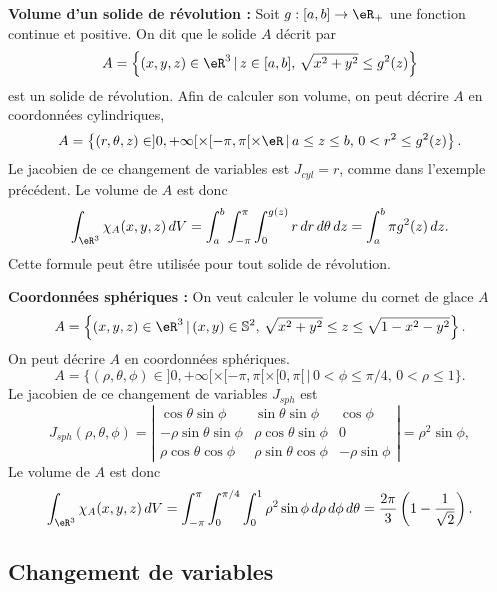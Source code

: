 \begin{example}
\textbf{Volume d'un solide de révolution : }Soit $g:[a,b]\to\eR_+$ une fonction continue et positive. On dit que le solide $A$ décrit par
\[
A=\left\{(x,y,z)\in\eR^3\, \vert \, z\in[a,b], \,\sqrt{x^2+y^2}\leq g^2(z) \right\}
\]
est un solide de révolution. Afin de calculer son volume, on peut décrire $A$ en coordonnées cylindriques, 
\[
A=\left\{(r,\theta,z) \in ]0, +\infty[\times [-\pi,\pi[\times \eR\,\vert\, a\leq z\leq b, \, 0<r^2\leq g^2(z) \right\}.
\]
Le jacobien de ce changement de variables est  $J_{cyl}=r$, comme dans l'exemple précédent. Le volume de $A$ est donc
\[
\int_{\eR^3}\chi_{A}(x,y,z)\, dV=\int_a^{b}\int_{-\pi}^{\pi}\int_{0}^{g(z)} r  \,dr\,d\theta\, dz=\int_a^{b} \pi g^2(z) \, dz.
\] 
Cette formule peut être utilisée pour tout solide de révolution. 
\end{example}

\begin{example}
\textbf{Coordonnées sphériques : }On veut calculer le volume du cornet de glace  $A$ 
\[
A=\left\{(x,y,z)\in\eR^3\, \vert \, (x,y)\in \mathbb{S}^2, \,\sqrt{x^2+y^2}\leq z\leq \sqrt{1-x^2-y^2} \right\}. 
\]
On peut décrire $A$ en coordonnées sphériques. 
\[
A=\{(\rho,\theta,\phi) \in ]0, +\infty[\times [-\pi,\pi[\times [0,\pi[\,\vert\, 0<\phi\leq\pi/4, \, 0<\rho\leq 1 \}.
\]
Le jacobien de ce changement de variables  $J_{sph}$ est
\begin{equation}
 J_{sph}(\rho, \theta, \phi)= \left\vert\begin{array}{ccc}
\cos \theta \sin\phi & \sin \theta\sin\phi & \cos\phi\\
-\rho\sin \theta\sin\phi  & \rho\cos \theta\sin\phi & 0 \\
\rho\cos\theta\cos\phi&\rho\sin\theta\cos\phi& -\rho\sin\phi
\end{array}\right\vert= \rho^2\sin\phi,
\end{equation}
Le volume de $A$ est donc
\[
\int_{\eR^3}\chi_{A}(x,y,z)\, dV=\int_{-\pi}^{\pi}\int_0^{\pi/4}\int_{0}^{1}\rho^2\sin\phi \,d\rho\,d\phi\,d\theta=\frac{2\pi}{3}\left(1-\frac{1}{\sqrt{2}}\right).  
\] 
\end{example}

					\subsection{Changement de variables}

